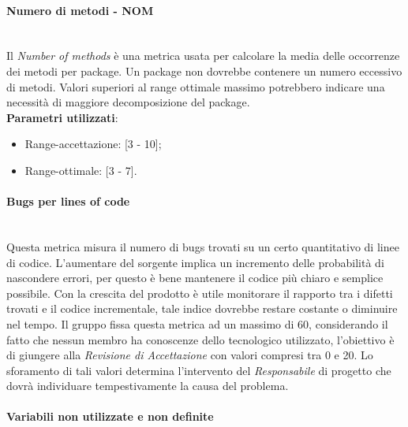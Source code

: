 			
			\paragraph{Numero di metodi - NOM}\mbox{} \\
				
			Il \emph{Number of methods} è una metrica usata per calcolare la media delle occorrenze dei metodi per package. Un package non dovrebbe contenere un numero eccessivo di metodi. Valori superiori al range ottimale massimo potrebbero indicare una necessità di maggiore decomposizione del package.\\
			\textbf{Parametri utilizzati}:
			\begin{itemize}
				\item Range-accettazione: [3 - 10];
				\item Range-ottimale: [3 - 7].
			\end{itemize}

			
			\paragraph{Bugs per lines of code}\mbox{} \\
			
			Questa metrica misura il numero di bugs trovati su un certo quantitativo di linee di codice. L'aumentare del sorgente implica un incremento delle probabilità di nascondere errori, per questo è bene mantenere il codice più chiaro e semplice possibile. Con la crescita del prodotto è utile monitorare il rapporto tra i difetti trovati e il codice incrementale, tale indice dovrebbe restare costante o diminuire nel tempo.
			Il gruppo fissa questa metrica ad un massimo di 60, considerando il fatto che nessun membro ha conoscenze dello  tecnologico utilizzato, l’obiettivo è di giungere alla \textit{Revisione di Accettazione} con valori compresi tra 0 e 20. Lo sforamento di tali valori determina l’intervento del \textit{Responsabile} di progetto che dovrà individuare tempestivamente la causa del problema.


			\paragraph{Variabili non utilizzate e non definite}\mbox{} \\
				
